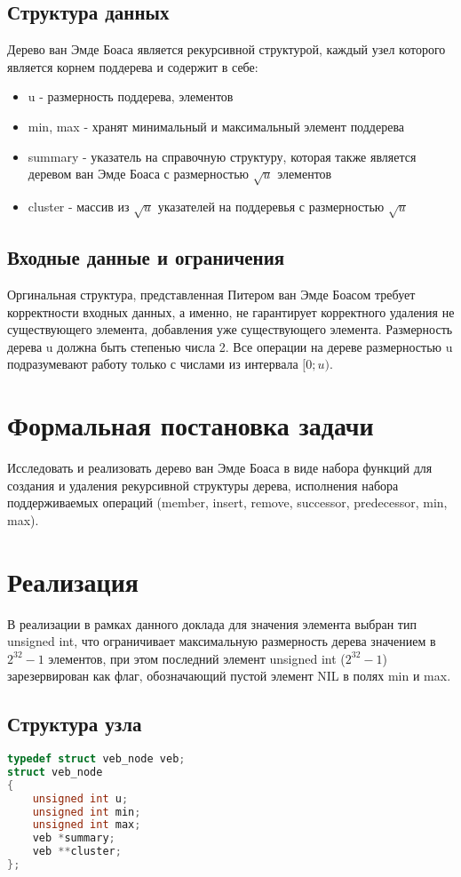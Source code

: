 \documentclass{article}
\begin{document}
\subsection{Структура данных}
Дерево ван Эмде Боаса является рекурсивной структурой, каждый узел которого является корнем поддерева и содержит в себе:
\begin{itemize}
    \item u - размерность поддерева, элементов
    \item min, max - хранят минимальный и максимальный элемент поддерева
    \item summary - указатель на справочную структуру, которая также является деревом ван Эмде Боаса с размерностью $\sqrt{u}$ элементов 
    \item cluster - массив из $\sqrt{u}$ указателей на поддеревья с размерностью $\sqrt{u}$
\end{itemize}
\subsection{Входные данные и ограничения}
Оргинальная структура, представленная Питером ван Эмде Боасом требует корректности входных данных, а именно, не гарантирует корректного удаления не существующего элемента, добавления уже существующего элемента. Размерность дерева u должна быть степенью числа 2. Все операции на дереве размерностью u подразумевают работу только с числами из интервала $[0;u)$.
\section{Формальная постановка задачи}
Исследовать и реализовать дерево ван Эмде Боаса в виде набора функций для создания и удаления рекурсивной структуры дерева, исполнения набора поддерживаемых операций (member, insert, remove, successor, predecessor, min, max).
\section{Реализация}
В реализации в рамках данного доклада для значения элемента выбран тип unsigned int, что ограничивает максимальную размерность дерева значением в $2^{32}-1$ элементов, при этом последний элемент unsigned int ($2^{32}-1$) зарезервирован как флаг, обозначающий пустой элемент NIL в полях min и max.
\subsection{Структура узла}
\begin{lstlisting}[language=C,style=C]
typedef struct veb_node veb;
struct veb_node
{
    unsigned int u;
    unsigned int min;
    unsigned int max;
    veb *summary;
    veb **cluster;
};
\end{lstlisting}
\end{document}
